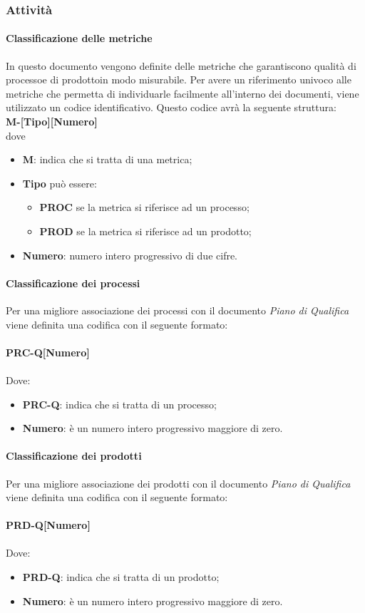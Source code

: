 \subsubsection{Attività}
\paragraph{Classificazione delle metriche}
In questo documento vengono definite delle metriche che garantiscono qualità di processo\glosp e di prodotto\glosp in modo misurabile.
Per avere un riferimento univoco alle metriche che permetta di individuarle facilmente all'interno dei documenti, viene utilizzato un codice identificativo. Questo codice avrà la seguente struttura: \\
\textbf{M-[Tipo][Numero]} \\
dove 
\begin{itemize}
	\item \textbf{M}: indica che si tratta di una metrica;
	\item \textbf{Tipo} può essere:
	\begin{itemize}
		\item \textbf{PROC} se la metrica si riferisce ad un processo;
		\item \textbf{PROD} se la metrica si riferisce ad un prodotto;
	\end{itemize}
	\item \textbf{Numero}: numero intero progressivo di due cifre.
\end{itemize}

\paragraph{Classificazione dei processi}
Per una migliore associazione dei processi con il documento \textit{Piano di Qualifica} viene definita una codifica con il seguente formato: \\
\\ \textbf{PRC-Q[Numero]} \\
\\ Dove:
\begin{itemize}
	\item \textbf{PRC-Q}: indica che si tratta di un processo;
	\item \textbf{Numero}: è un numero intero progressivo maggiore di zero.
\end{itemize}

\paragraph{Classificazione dei prodotti}
Per una migliore associazione dei prodotti con il documento \textit{Piano di Qualifica} viene definita una codifica con il seguente formato: \\
\\ \textbf{PRD-Q[Numero]} \\
\\ Dove:
\begin{itemize}
	\item \textbf{PRD-Q}: indica che si tratta di un prodotto;
	\item \textbf{Numero}: è un numero intero progressivo maggiore di zero.
\end{itemize}

